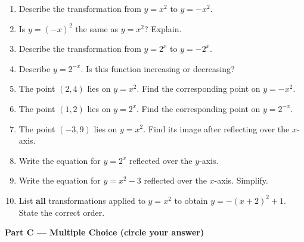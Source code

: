 \documentclass[12pt]{article}
\begin{document}
\vspace{0.3em}
\begin{enumerate}[label=\textbf{C\arabic*.},leftmargin=*,itemsep=10pt]
\item Describe the transformation from $y=x^2$ to $y=-x^2$.\vspace{1.6cm}
\item Is $y=(-x)^2$ the same as $y=x^2$? Explain.\vspace{1.6cm}
\item Describe the transformation from $y=2^x$ to $y=-2^x$.\vspace{1.6cm}
\item Describe $y=2^{-x}$. Is this function increasing or decreasing?\vspace{1.6cm}
\item The point $(2,4)$ lies on $y=x^2$. Find the corresponding point on $y=-x^2$.\vspace{1.6cm}
\item The point $(1,2)$ lies on $y=2^x$. Find the corresponding point on $y=2^{-x}$.\vspace{1.6cm}
\item The point $(-3,9)$ lies on $y=x^2$. Find its image after reflecting over the $x$-axis.\vspace{1.6cm}
\item Write the equation for $y=2^x$ reflected over the $y$-axis.\vspace{1.6cm}
\item Write the equation for $y=x^2-3$ reflected over the $x$-axis. Simplify.\vspace{1.6cm}
\item List \textbf{all} transformations applied to $y=x^2$ to obtain $y=-(x+2)^2+1$. State the correct order.\vspace{1.6cm}
\end{enumerate}

\newpage
\noindent\textbf{\large Part C --- Multiple Choice (circle your answer)}
\vspace{0.5em}
\end{document}

